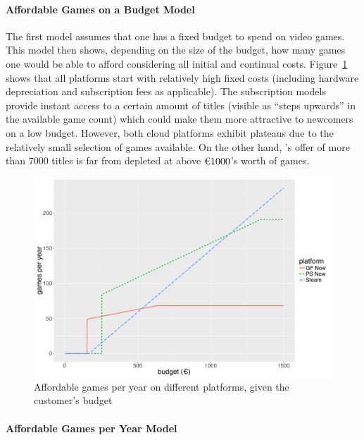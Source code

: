 \paragraph{Affordable Games on a Budget Model}

The first model assumes that one has a fixed budget to spend on video games. This model then shows, depending on the size of the budget, how many games one would be able to afford considering all initial and continual costs.
Figure~\ref{fig:gamesperyear-over-budget} shows that all platforms start with relatively high fixed costs (including hardware depreciation and subscription fees as applicable). The subscription models provide instant access to a certain amount of titles (visible as ``steps upwards'' in the available game count) which could make them more attractive to newcomers on a low budget. However, both cloud platforms exhibit plateaus due to the relatively small selection of games available. On the other hand, \steam's offer of more than $7000$ titles is far from depleted at above $\text{\texteuro} 1000$'s worth of games.

\begin{figure}[!t]
	\centering
	\includegraphics[width=1.0\columnwidth]{images/gamesperyear-over-budget.pdf}
	\caption{Affordable games per year on different platforms, given the customer's budget}
\label{fig:gamesperyear-over-budget}
\end{figure}


\paragraph{Affordable Games per Year Model}

